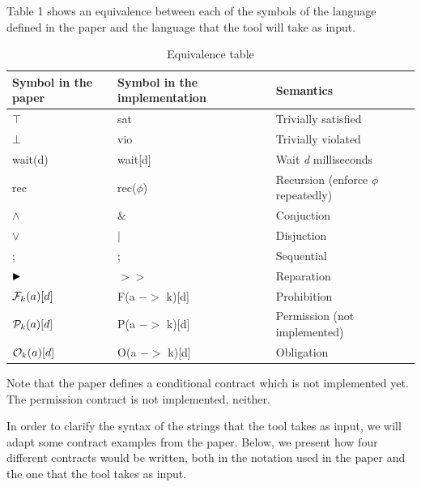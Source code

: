 \documentclass{article}
\begin{document}
Table 1 shows an equivalence between each of the symbols of the language defined in the paper and the language that the tool will take as input.

\begin{table}[hp]
\centering
\caption{Equivalence table}
\label{my-label}
\begin{tabular}{|l|l|l|}
 Symbol in the paper & Symbol in the implementation & Semantics \\ \hline
 $\top$ & sat & Trivially satisfied                                    \\
 $\bot$ & vio & Trivially violated                                    \\
 wait(d) & wait[d] & Wait \textit{d} milliseconds                                   \\
 rec & rec($\phi$) & Recursion (enforce $\phi$ repeatedly)        \\
 $\wedge$ & \& & Conjuction                                     \\
 $\vee$ & $|$  & Disjuction                                     \\
; & ; & Sequential                                      \\
  $\blacktriangleright$ & $>>$ & Reparation            \\
  ${\mathcal{F}_{k}(a)}[d]$  & F(a $->$ k){[}d{]} & Prohibition \\
  ${\mathcal{P}_{k}(a)}[d]$  & P(a $->$ k){[}d{]} & Permission (not implemented) \\
  ${\mathcal{O}_{k}(a)}[d]$  & O(a $->$ k){[}d{]} & Obligation \\
                                         
\end{tabular}
\end{table}

Note that the paper defines a conditional contract which is not implemented yet. The permission contract is not implemented, neither.

In order to clarify the syntax of the strings that the tool takes as input, we will adapt some contract examples from the paper. Below, we present how four different contracts would be written, both in the notation used in the paper and the one that the tool takes as input.
\end{document}
